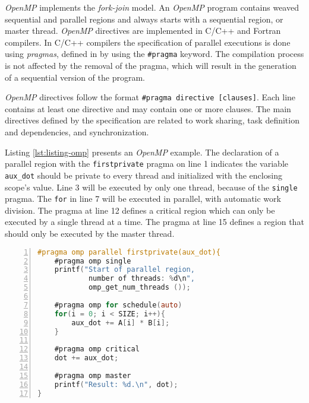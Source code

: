 \textit{OpenMP} implements the \textit{fork-join} model. An \textit{OpenMP}
program contains weaved sequential and parallel regions and always starts with
a sequential region, or master thread.  \textit{OpenMP} directives are
implemented in C/C++ and Fortran compilers. In C/C++ compilers the
specification of parallel executions is done using \textit{pragmas}, defined in
by using the \texttt{\#pragma} keyword.
The compilation process is not affected by the removal of the pragma,
which will result in the generation of a sequential version of the program.

\textit{OpenMP} directives follow the format \texttt{\#pragma directive
[clauses]}.  Each line contains at least one directive and may contain one or
more clauses. The main directives defined by the specification are related
to work sharing, task definition and dependencies, and synchronization.

Listing \ref{lst:listing-omp} presents an \textit{OpenMP} example. The
declaration of a parallel region with the \texttt{firstprivate} pragma on line
1 indicates the variable \texttt{aux\_dot} should be private to every thread
and initialized with the enclosing scope's value.  Line 3 will be executed by
only one thread, because of the \texttt{single} pragma.
The \texttt{for} in line 7 will be executed in parallel, with automatic work
division.  The pragma at line 12 defines a critical region which can only be
executed by a single thread at a time. The pragma at line 15 defines a
region that should only be executed by the master thread.

\begin{lstlisting}[language=C, basicstyle=\ttfamily\scriptsize, numbers=left,
                   frame=no, showspaces=false, showstringspaces=false,
                   caption={\textit{OpenMP} Sample Program}, captionpos=b,
                   numberstyle=\tiny,
                   xleftmargin=0.6cm,
                   label=lst:listing-omp, keywords={%
                       \#pragma,
                       omp, parallel, firstprivate,
                       single, omp_get_num_threads,
                       for, schedule, auto,
                       critical, master,
                       NULL, int, main,
                       void, printf, return%
                   },
                   otherkeywords={::, \#pragma, \#include, <<<,>>>, \&, \*, +, -, /, [, ], >, <}
                       ]
#pragma omp parallel firstprivate(aux_dot){
    #pragma omp single
    printf("Start of parallel region,
            number of threads: %d\n",
            omp_get_num_threads ());

    #pragma omp for schedule(auto)
    for(i = 0; i < SIZE; i++){
        aux_dot += A[i] * B[i];
    }

    #pragma omp critical
    dot += aux_dot;

    #pragma omp master
    printf("Result: %d.\n", dot);
}
\end{lstlisting}
